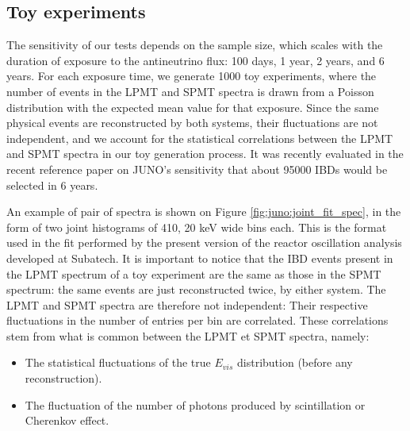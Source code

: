 \documentclass[../main.tex]{subfiles}
\begin{document}
%
%

\subsection{Toy experiments}
\label{sec:joint_fit:approach:data_prod}

The sensitivity of our tests depends on the sample size, which scales with the duration of exposure to the antineutrino flux: 100 days, 1 year, 2 years, and 6 years. For each exposure time, we generate 1000 toy experiments, where the number of events in the LPMT and SPMT spectra is drawn from a Poisson distribution with the expected mean value for that exposure. Since the same physical events are reconstructed by both systems, their fluctuations are not independent, and we account for the statistical correlations between the LPMT and SPMT spectra in our toy generation process.
It was recently evaluated in the recent reference paper on JUNO's sensitivity \cite{abusleme_potential_2024} that about 95000 IBDs would be selected in 6 years.

An example of pair of spectra is shown on Figure \ref{fig:juno:joint_fit_spec}, in the form of two joint histograms of 410, 20 keV wide bins each. This is the format used in the fit performed by the present version of the reactor oscillation analysis developed at Subatech. It is important to notice that the IBD events present in the LPMT spectrum of a toy experiment are the same as those in the SPMT spectrum: the same events are just reconstructed twice, by either system. The LPMT and SPMT spectra are therefore not independent: Their respective fluctuations in the number of entries per bin are correlated. These correlations stem from what is common between the LPMT et SPMT spectra, namely:

\begin{itemize}
  \item The statistical fluctuations of the true $E_{vis}$ distribution (before any reconstruction).
  \item The fluctuation of the number of photons produced by scintillation or Cherenkov effect.
\end{itemize}
\hfill
\end{document}
